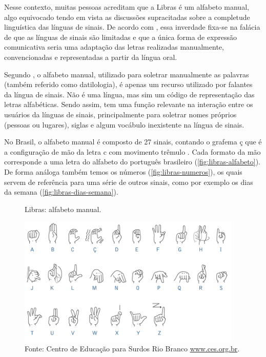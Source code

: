 Nesse contexto, muitas pessoas acreditam que a Libras é um alfabeto manual, algo equivocado tendo em vista as discussões supracitadas sobre a completude linguística das línguas de sinais. De acordo com , essa inverdade fixa-se na falácia de que as línguas de sinais são limitadas e que a única forma de expressão comunicativa seria uma adaptação das letras realizadas manualmente, convencionadas e representadas a partir da língua oral.

Segundo , o alfabeto manual, utilizado para soletrar manualmente as palavras (também referido como datilologia), é apenas um recurso utilizado por falantes da língua de sinais. Não é uma língua, mas sim um código de representação das letras alfabéticas. Sendo assim, tem uma função relevante na interação entre os usuários da línguas de sinais, principalmente para soletrar nomes próprios (pessoas ou lugares), siglas e algum vocábulo inexistente na língua de sinais.

No Brasil, o alfabeto manual é composto de 27 sinais, contando o grafema ç que é a configuração de mão da letra c com movimento trêmulo \cite{Gesser2009}. Cada formato da mão corresponde a uma letra do alfabeto do português brasileiro (\autoref{fig:libras-alfabeto}). De forma análoga também temos os números (\autoref{fig:libras-numeros}), os quais servem de referência para uma série de outros sinais, como por exemplo os dias da semana (\autoref{fig:libras-dias-semana}).

\begin{figure}[htbp]
\caption{Libras: alfabeto manual.}
\label{fig:libras-alfabeto}
\centerline{\includegraphics[width=0.95\textwidth]{images/libras-alfabeto.jpg}}
\caption*{Fonte: Centro de Educação para Surdos Rio Branco \url{www.ces.org.br}.}
\end{figure}


